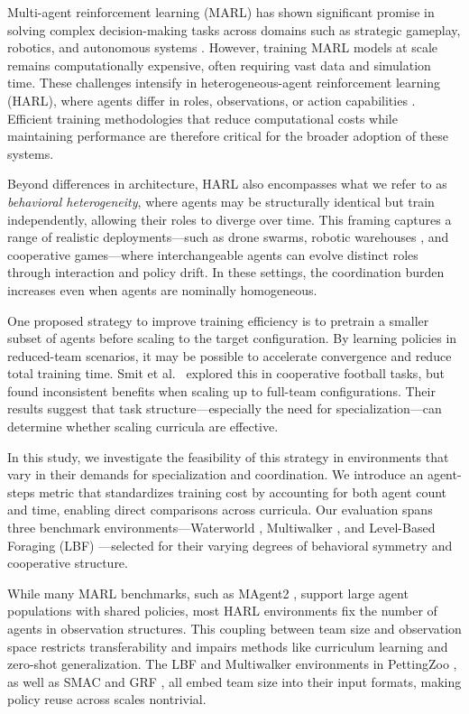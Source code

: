 \documentclass{article}
\begin{document}
Multi-agent reinforcement learning (MARL) has shown significant promise in solving complex 
decision-making tasks across domains such as strategic gameplay, robotics, and 
autonomous systems \cite{silver2016, vinyals2019, berner2019}. 
However, training MARL models at scale remains computationally expensive, 
often requiring vast data and simulation time. These challenges intensify in 
heterogeneous-agent reinforcement learning (HARL), where agents differ in roles, 
observations, or action capabilities \cite{rizk2019, yang2021a}. 
Efficient training methodologies that reduce computational costs while maintaining 
performance are therefore critical for the broader adoption of these systems.

Beyond differences in architecture, HARL also encompasses what we refer to as 
\emph{behavioral heterogeneity}, where agents may be structurally identical 
but train independently, allowing their roles to diverge over time. 
This framing captures a range of realistic deployments—such as drone swarms, 
robotic warehouses \cite{rizk2019}, and cooperative games—where interchangeable agents 
can evolve distinct roles through interaction and policy drift. 
In these settings, the coordination burden increases even when agents are nominally homogeneous.

One proposed strategy to improve training efficiency is to pretrain a smaller subset of agents 
before scaling to the target configuration. By learning policies in reduced-team scenarios, 
it may be possible to accelerate convergence and reduce total training time. 
Smit et al.\ \cite{smit2023} explored this in cooperative football tasks, 
but found inconsistent benefits when scaling up to full-team configurations. 
Their results suggest that task structure—especially the need for specialization—can determine 
whether scaling curricula are effective.

In this study, we investigate the feasibility of this strategy in environments 
that vary in their demands for specialization and coordination. 
We introduce an agent-steps metric that standardizes training cost by accounting for 
both agent count and time, enabling direct comparisons across curricula. 
Our evaluation spans three benchmark environments—Waterworld \cite{gupta2017}, 
Multiwalker \cite{gupta2017}, and Level-Based Foraging (LBF) \cite{papoudakis2021}—selected 
for their varying degrees of behavioral symmetry and cooperative structure.

While many MARL benchmarks, such as MAgent2 \cite{zheng2017}, 
support large agent populations with shared policies, most HARL environments fix the number 
of agents in observation structures. This coupling between team size and observation space 
restricts transferability and impairs methods like curriculum learning and zero-shot generalization. 
The LBF and Multiwalker environments in PettingZoo \cite{terry2021}, 
as well as SMAC \cite{samvelyan2019} and GRF \cite{kurach2020}, all embed team size 
into their input formats, making policy reuse across scales nontrivial.
\end{document}
